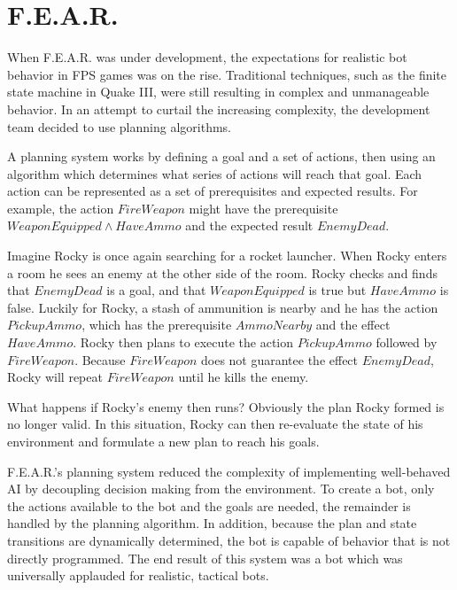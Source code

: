 \section{F.E.A.R.}

 When F.E.A.R. was under development, the expectations for realistic bot behavior in FPS games was on the rise. Traditional techniques, such as the finite state machine in Quake III, were still resulting in complex and unmanageable behavior. In an attempt to curtail the increasing complexity, the development team decided to use planning algorithms.

A planning system works by defining a goal and a set of actions, then using an algorithm which determines what series of actions will reach that goal. Each action can be represented as a set of prerequisites and expected results. For example, the action $FireWeapon$ might have the prerequisite $WeaponEquipped \land HaveAmmo$ and the expected result $EnemyDead$.

Imagine Rocky is once again searching for a rocket launcher. When Rocky enters a room he sees an enemy at the other side of the room. Rocky checks and finds that $EnemyDead$ is a goal, and that $WeaponEquipped$ is true but  $HaveAmmo$ is false. Luckily for Rocky, a stash of ammunition is nearby and he has the action $PickupAmmo$, which has the prerequisite $AmmoNearby$ and the effect $HaveAmmo$. Rocky then plans to execute the action $PickupAmmo$ followed by $FireWeapon$. Because $FireWeapon$ does not guarantee the effect $EnemyDead$, Rocky will repeat $FireWeapon$ until he kills the enemy.

What happens if Rocky's enemy then runs? Obviously the plan Rocky formed is no longer valid. In this situation, Rocky can then re-evaluate the state of his environment and formulate a new plan to reach his goals.

F.E.A.R.'s planning system reduced the complexity of implementing well-behaved AI by decoupling decision making from the environment. To create a bot, only the actions available to the bot and the goals are needed, the remainder is handled by the planning algorithm. In addition, because the plan and state transitions are dynamically determined, the bot is capable of behavior that is not directly programmed. The end result of this system was a bot which was universally applauded for realistic, tactical bots.